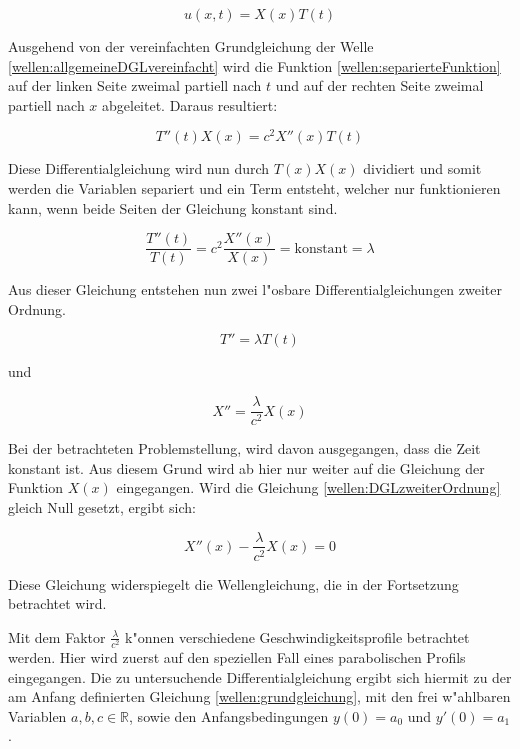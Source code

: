 \begin{refsection}
\begin{equation}
	u (x,t) = X(x) T(t)
	\label{wellen:separierteFunktion}
\end{equation}

Ausgehend von der vereinfachten Grundgleichung der Welle 
\ref{wellen:allgemeineDGLvereinfacht} wird die Funktion 
\ref{wellen:separierteFunktion} auf der linken Seite zweimal partiell nach $t$ 
und auf der rechten Seite zweimal partiell nach $x$ abgeleitet. Daraus 
resultiert:

\begin{equation}
	T''(t) X(x) = c^2 X''(x)T(t)
\end{equation}

Diese Differentialgleichung wird nun durch $T(x)X(x)$ dividiert und somit 
werden die Variablen separiert und ein Term entsteht, welcher nur funktionieren 
kann, wenn beide Seiten der Gleichung konstant sind. 

\begin{equation*}
	\frac{T''(t)}{T(t)}
	=
	c^2 \frac{X''(x)}{X(x)} = \text{konstant} = \lambda
\end{equation*}

Aus dieser Gleichung entstehen nun zwei l"osbare Differentialgleichungen 
zweiter Ordnung.

\begin{equation*}
	T''= \lambda T(t)
\end{equation*}

und

\begin{equation}
	X'' = \frac{\lambda}{c^2}X(x)
	\label{wellen:DGLzweiterOrdnung}
\end{equation}

Bei der betrachteten Problemstellung, wird davon ausgegangen, dass die 
Zeit konstant ist. Aus diesem Grund wird ab hier nur weiter auf die Gleichung 
der Funktion $X(x)$ eingegangen. Wird die Gleichung 
\ref{wellen:DGLzweiterOrdnung} gleich Null gesetzt, ergibt sich:

\begin{equation*}
	X''(x) - \frac{\lambda}{c^2} X(x) = 0
\end{equation*}

Diese Gleichung widerspiegelt die Wellengleichung, die in der Fortsetzung 
betrachtet wird.

Mit dem Faktor $\frac{\lambda}{c^2}$ k"onnen verschiedene 
Geschwindigkeitsprofile betrachtet werden. Hier wird zuerst auf den speziellen 
Fall eines parabolischen Profils eingegangen. Die zu untersuchende 
Differentialgleichung ergibt sich hiermit zu der am Anfang definierten 
Gleichung \ref{wellen:grundgleichung}, mit den frei w"ahlbaren Variablen 
${a,b,c} \in \mathbb{R}$, sowie den Anfangsbedingungen $y(0) = a_0$ und $y'(0) 
= a_1$.


\end{refsection}
